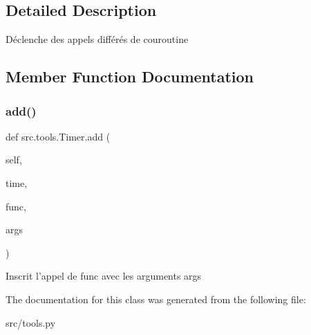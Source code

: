\subsection{Detailed Description}
\begin{DoxyVerb}Déclenche des appels différés de couroutine \end{DoxyVerb}
 

\subsection{Member Function Documentation}
\hypertarget{classsrc_1_1tools_1_1_timer_a9aed0346c5a6131bb4cc02821f11ad73}{}\label{classsrc_1_1tools_1_1_timer_a9aed0346c5a6131bb4cc02821f11ad73} 
\subsubsection{\texorpdfstring{add()}{add()}}
{\footnotesize\ttfamily def src.\+tools.\+Timer.\+add (\begin{DoxyParamCaption}\item[{}]{self,  }\item[{}]{time,  }\item[{}]{func,  }\item[{}]{args }\end{DoxyParamCaption})}

\begin{DoxyVerb}Inscrit l'appel de func avec les arguments args \end{DoxyVerb}
 

The documentation for this class was generated from the following file\+:\begin{DoxyCompactItemize}
\item 
src/tools.\+py\end{DoxyCompactItemize}
